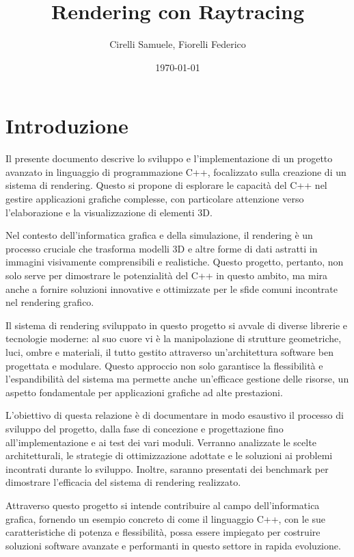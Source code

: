 \documentclass[12pt]{article}
\title{Rendering con Raytracing}
\author{Cirelli Samuele, Fiorelli Federico}
\date{\today}
\begin{document}
\maketitle

\tableofcontents
\newpage

\section{Introduzione}
Il presente documento descrive lo sviluppo e l'implementazione di un progetto avanzato in linguaggio di programmazione C++, focalizzato sulla creazione di un sistema di rendering. Questo si propone di esplorare le capacità del C++ nel gestire applicazioni grafiche complesse, con particolare attenzione verso l'elaborazione e la visualizzazione di elementi 3D.

Nel contesto dell'informatica grafica e della simulazione, il rendering è un processo cruciale che trasforma modelli 3D e altre forme di dati astratti in immagini visivamente comprensibili e realistiche. Questo progetto, pertanto, non solo serve per dimostrare le potenzialità del C++ in questo ambito, ma mira anche a fornire soluzioni innovative e ottimizzate per le sfide comuni incontrate nel rendering grafico.

Il sistema di rendering sviluppato in questo progetto si avvale di diverse librerie e tecnologie moderne: al suo cuore vi è la manipolazione di strutture geometriche, luci, ombre e materiali, il tutto gestito attraverso un'architettura software ben progettata e modulare. Questo approccio non solo garantisce la flessibilità e l'espandibilità del sistema ma permette anche un'efficace gestione delle risorse, un aspetto fondamentale per applicazioni grafiche ad alte prestazioni.

L'obiettivo di questa relazione è di documentare in modo esaustivo il processo di sviluppo del progetto, dalla fase di concezione e progettazione fino all'implementazione e ai test dei vari moduli. Verranno analizzate le scelte architetturali, le strategie di ottimizzazione adottate e le soluzioni ai problemi incontrati durante lo sviluppo. Inoltre, saranno presentati dei benchmark per dimostrare l'efficacia del sistema di rendering realizzato.

Attraverso questo progetto si intende contribuire al campo dell'informatica grafica, fornendo un esempio concreto di come il linguaggio C++, con le sue caratteristiche di potenza e flessibilità, possa essere impiegato per costruire soluzioni software avanzate e performanti in questo settore in rapida evoluzione.
\end{document}
